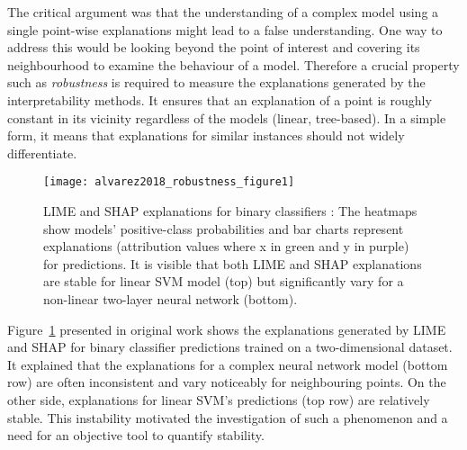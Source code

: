 \documentclass[english]{tktltiki2}
\theoremstyle{definition}
\theoremstyle{remark}
\begin{document}
The critical argument was that the understanding of a complex model using a single point-wise explanations might lead to a false understanding. One way to address this would be looking beyond the point of interest and covering its neighbourhood to examine the behaviour of a model. Therefore a crucial property such as \textit{robustness} is required to measure the explanations generated by the interpretability methods. It ensures that an explanation of a point is roughly constant in its vicinity regardless of the models (linear, tree-based).  In a simple form, it means that explanations for similar instances should not widely differentiate.


\begin{figure}[H]
	\centering
	\vspace*{-2mm}
	\texttt{[image: alvarez2018\_robustness\_figure1]}
	\vspace*{-10mm}
	\caption{LIME and SHAP explanations for binary classifiers \citep{alvarez2018robustness}: The heatmaps show models’ positive-class probabilities and bar charts represent explanations (attribution values where x in green and y in purple) for predictions. It is visible that both LIME and SHAP explanations are stable for linear SVM model (top) but significantly vary for a non-linear two-layer neural network (bottom).}
	\label{fig:alvarez2018_robustness_figure1}
\end{figure}

Figure~\ref{fig:alvarez2018_robustness_figure1} presented in original work \citep{alvarez2018robustness} shows the explanations generated by LIME \citep{ribeiro2016should} and SHAP \citep{lundberg2017unified} for binary classifier predictions trained on a two-dimensional dataset. It explained that the explanations for a complex neural network model (bottom row) are often inconsistent and vary noticeably for neighbouring points. On the other side, explanations for linear SVM's predictions (top row) are relatively stable. This instability motivated the investigation of such a phenomenon and a need for an objective tool to quantify stability.
\end{document}
